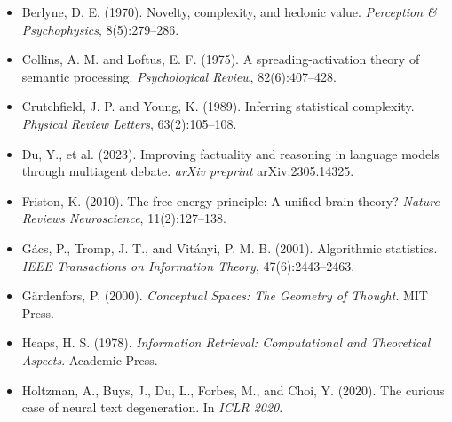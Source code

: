 \begin{itemize}
\item Berlyne, D. E. (1970). Novelty, complexity, and hedonic value. \textit{Perception \& Psychophysics}, 8(5):279--286.
\end{itemize}

\begin{itemize}
\item Collins, A. M. and Loftus, E. F. (1975). A spreading-activation theory of semantic processing. \textit{Psychological Review}, 82(6):407--428.
\end{itemize}

\begin{itemize}
\item Crutchfield, J. P. and Young, K. (1989). Inferring statistical complexity. \textit{Physical Review Letters}, 63(2):105--108.
\end{itemize}

\begin{itemize}
\item Du, Y., et al. (2023). Improving factuality and reasoning in language models through multiagent debate. \textit{arXiv preprint} arXiv:2305.14325.
\end{itemize}

\begin{itemize}
\item Friston, K. (2010). The free-energy principle: A unified brain theory? \textit{Nature Reviews Neuroscience}, 11(2):127--138.
\end{itemize}

\begin{itemize}
\item Gács, P., Tromp, J. T., and Vitányi, P. M. B. (2001). Algorithmic statistics. \textit{IEEE Transactions on Information Theory}, 47(6):2443--2463.
\end{itemize}

\begin{itemize}
\item Gärdenfors, P. (2000). \textit{Conceptual Spaces: The Geometry of Thought}. MIT Press.
\end{itemize}

\begin{itemize}
\item Heaps, H. S. (1978). \textit{Information Retrieval: Computational and Theoretical Aspects}. Academic Press.
\end{itemize}

\begin{itemize}
\item Holtzman, A., Buys, J., Du, L., Forbes, M., and Choi, Y. (2020). The curious case of neural text degeneration. In \textit{ICLR 2020}.
\end{itemize}

